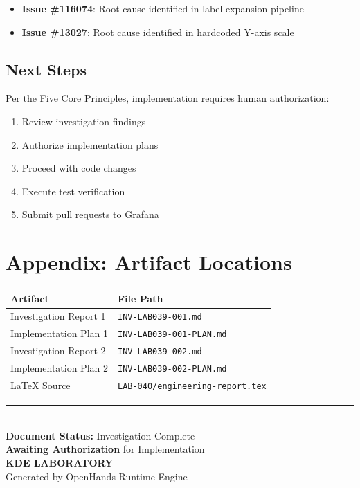 \documentclass[
    11pt,
    a4paper,
    oneside,
    abstract=on,
    parskip=full+,
    headings=big,
    bibliography=totoc
]{scrartcl}
\newcommand{\code}[1]{\texttt{#1}}
\begin{document}
\begin{keyfinding}
    \begin{itemize}
        \item \textbf{Issue \#116074}: Root cause identified in label expansion pipeline
        \item \textbf{Issue \#13027}: Root cause identified in hardcoded Y-axis scale
    \end{itemize}
\end{keyfinding}

\subsection{Next Steps}

Per the Five Core Principles, implementation requires human authorization:

\begin{enumerate}
    \item Review investigation findings
    \item Authorize implementation plans
    \item Proceed with code changes
    \item Execute test verification
    \item Submit pull requests to Grafana
\end{enumerate}

\newpage
\section*{Appendix: Artifact Locations}

\begin{tabular}{ll}
    \toprule
    \textbf{Artifact} & \textbf{File Path} \\
    \midrule
    Investigation Report 1 & \code{INV-LAB039-001.md} \\
    Implementation Plan 1 & \code{INV-LAB039-001-PLAN.md} \\
    Investigation Report 2 & \code{INV-LAB039-002.md} \\
    Implementation Plan 2 & \code{INV-LAB039-002-PLAN.md} \\
    LaTeX Source & \code{LAB-040/engineering-report.tex} \\
    \bottomrule
\end{tabular}

\vfill

\begin{center}
    \color{secondary}\rule{5cm}{0.5pt} \\
    \textbf{Document Status:} Investigation Complete \\
    \textbf{Awaiting Authorization} for Implementation \\
    \vspace{0.5cm}
    {\color{kde-blue}\LARGE\textbf{KDE LABORATORY}} \\
    \color{secondary}\small Generated by OpenHands Runtime Engine
\end{center}
\end{document}
